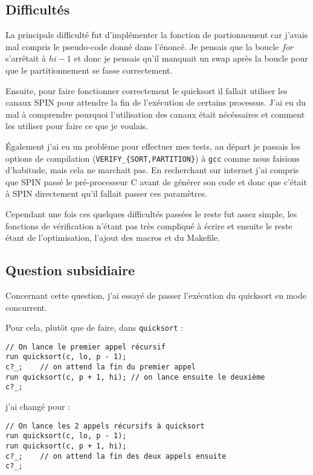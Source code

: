 \documentclass[french]{article}
\begin{document}
\subsection{Difficultés}
La principale difficulté fut d'implémenter la fonction de partionnement car j'avais mal compris
le pseudo-code donné dans l'énoncé. Je pensais que la boucle $for$ s'arrêtait à $hi-1$ et donc
je pensais qu'il manquait un swap après la boucle pour que le partitionnement se fasse
correctement.\newline

Ensuite, pour faire fonctionner correctement le quicksort il fallait utiliser les canaux SPIN pour
attendre la fin de l'exécution de certains processus. J'ai eu du mal à comprendre pourquoi
l'utilisation des canaux était nécéssaires et comment les utiliser pour faire ce que je voulais.
\newline

Également j'ai eu un problème pour effectuer mes tests, au départ je passais les options de
compilation (\verb:VERIFY_{SORT,PARTITION}:) à \verb:gcc: comme nous faisions d'habitude, mais cela
ne marchait pas. En recherchant sur internet j'ai compris que SPIN passé le pré-processeur C
avant de générer son code et donc que c'était à SPIN directement qu'il fallait passer ces
paramètres.\newline

Cependant une fois ces quelques difficultés passées le reste fut assez simple, les fonctions de
vérification n'étant pas très compliqué à écrire et ensuite le reste étant de l'optimisation,
l'ajout des macros et du Makefile.

\subsection{Question subsidiaire}
Concernant cette question, j'ai essayé de passer l'exécution du quicksort en mode concurrent.

Pour cela, plutôt que de faire, dans \verb:quicksort: :
\begin{verbatim}
// On lance le premier appel récursif
run quicksort(c, lo, p - 1); 
c?_;    // on attend la fin du premier appel
run quicksort(c, p + 1, hi); // on lance ensuite le deuxième
c?_;
\end{verbatim}
j'ai changé pour :
\begin{verbatim}
// On lance les 2 appels récursifs à quicksort
run quicksort(c, lo, p - 1); 
run quicksort(c, p + 1, hi);
c?_;    // on attend la fin des deux appels ensuite
c?_;
\end{verbatim}
\end{document}
